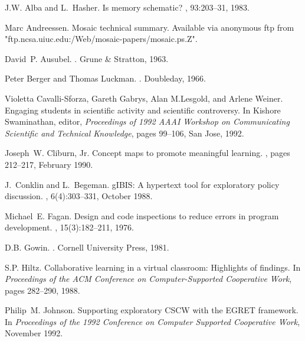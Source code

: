 \begin{thebibliography}{1}

J.W. Alba and L.~Hasher.
\newblock Is memory schematic?
, 93:203--31, 1983.

Marc Andreessen.
 {M}osaic technical summary.
\newblock Available via anonymous ftp from
  "ftp.ncsa.uiuc.edu:/Web/mosaic-papers/mosaic.ps.Z".

David~P. Ausubel.
.
\newblock Grune \& Stratton, 1963.

Peter Berger and Thomas Luckman.
.
\newblock Doubleday, 1966.

Violetta Cavalli-Sforza, Gareth Gabrys, Alan M.Lesgold, and Arlene Weiner.
\newblock Engaging students in scientific activity and scientific controversy.
\newblock In Kishore Swaminathan, editor, {\em Proceedings of 1992 AAAI
  Workshop on Communicating Scientific and Technical Knowledge}, pages 99--106,
  San Jose, 1992.

Joseph~W. {Cliburn, Jr.}
\newblock Concept maps to promote meaningful learning.
, pages 212--217, February
  1990.

J.~Conklin and L.~Begeman.
\newblock g{IBIS}: A hypertext tool for exploratory policy discussion.
, 6(4):303--331,
  October 1988.

Michael~E. Fagan.
\newblock Design and code inspections to reduce errors in program development.
, 15(3):182--211, 1976.

D.B. Gowin.
.
\newblock Cornell University Press, 1981.

S.P. Hiltz.
\newblock Collaborative learning in a virtual classroom: Highlights of
  findings.
\newblock In {\em Proceedings of the ACM Conference on Computer-Supported
  Cooperative Work}, pages 282--290, 1988.

Philip~M. Johnson.
\newblock Supporting exploratory {CSCW} with the {EGRET} framework.
\newblock In {\em Proceedings of the 1992 Conference on Computer Supported
  Cooperative Work}, November 1992.


\end{thebibliography}
